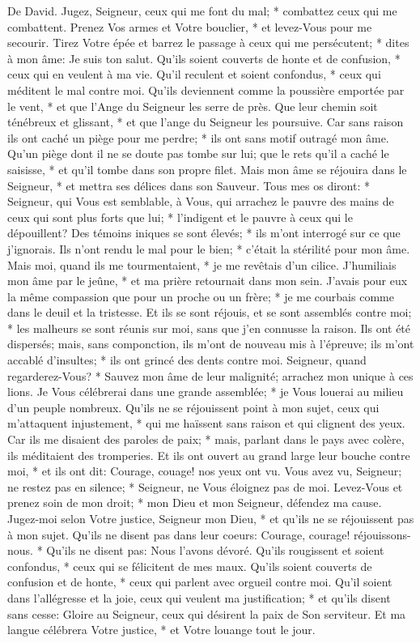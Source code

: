 De David. Jugez, Seigneur, ceux qui me font du mal; * combattez ceux qui me combattent.
Prenez Vos armes et Votre bouclier, * et levez-Vous pour me secourir.
Tirez Votre épée et barrez le passage à ceux qui me persécutent; * dites à mon âme: Je suis ton salut.
Qu'ils soient couverts de honte et de confusion, * ceux qui en veulent à ma vie. Qu'il reculent et soient confondus, * ceux qui méditent le mal contre moi.
Qu'ils deviennent comme la poussière emportée par le vent, * et que l'Ange du Seigneur les serre de près.
Que leur chemin soit ténébreux et glissant, * et que l'ange du Seigneur les poursuive.
Car sans raison ils ont caché un piège pour me perdre; * ils ont sans motif outragé mon âme.
Qu'un piège dont il ne se doute pas tombe sur lui; que le rets qu'il a caché le saisisse, * et qu'il tombe dans son propre filet.
Mais mon âme se réjouira dans le Seigneur, * et mettra ses délices dans son Sauveur.
Tous mes os diront: * Seigneur, qui Vous est semblable, à Vous, qui arrachez le pauvre des mains de ceux qui sont plus forts que lui; * l'indigent et le pauvre à ceux qui le dépouillent?
Des témoins iniques se sont élevés; * ils m'ont interrogé sur ce que j'ignorais.
Ils n'ont rendu le mal pour le bien; * c'était la stérilité pour mon âme.
Mais moi, quand ils me tourmentaient, * je me revêtais d'un cilice. J'humiliais mon âme par le jeûne, * et ma prière retournait dans mon sein.
J'avais pour eux la même compassion que pour un proche ou un frère; * je me courbais comme dans le deuil et la tristesse.
Et ils se sont réjouis, et se sont assemblés contre moi; * les malheurs se sont réunis sur moi, sans que j'en connusse la raison.
Ils ont été dispersés; mais, sans componction, ils m'ont de nouveau mis à l'épreuve; ils m'ont accablé d'insultes; * ils ont grincé des dents contre moi.
Seigneur, quand regarderez-Vous? * Sauvez mon âme de leur malignité; arrachez mon unique à ces lions.
Je Vous célébrerai dans une grande assemblée; * je Vous louerai au milieu d'un peuple nombreux.
Qu'ils ne se réjouissent point à mon sujet, ceux qui m'attaquent injustement, * qui me haïssent sans raison et qui clignent des yeux.
Car ils me disaient des paroles de paix; * mais, parlant dans le pays avec colère, ils méditaient des tromperies.
Et ils ont ouvert au grand large leur bouche contre moi, * et ils ont dit: Courage, couage! nos yeux ont vu.
Vous avez vu, Seigneur; ne restez pas en silence; * Seigneur, ne Vous éloignez pas de moi.
Levez-Vous et prenez soin de mon droit; * mon Dieu et mon Seigneur, défendez ma cause.
Jugez-moi selon Votre justice, Seigneur mon Dieu, * et qu'ils ne se réjouissent pas à mon sujet.
Qu'ils ne disent pas dans leur coeurs: Courage, courage! réjouissons-nous. * Qu'ils ne disent pas: Nous l'avons dévoré.
Qu'ils rougissent et soient confondus, * ceux qui se félicitent de mes maux. Qu'ils soient couverts de confusion et de honte, * ceux qui parlent avec orgueil contre moi.
Qu'il soient dans l'allégresse et la joie, ceux qui veulent ma justification; * et qu'ils disent sans cesse: Gloire au Seigneur, ceux qui désirent la paix de Son serviteur.
Et ma langue célébrera Votre justice, * et Votre louange tout le jour.

